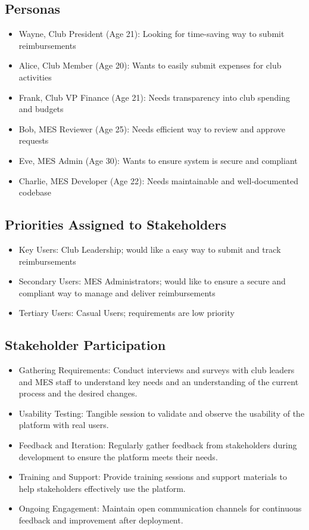 \documentclass[12pt]{article}
\begin{document}
  \subsection{Personas}
    \begin{itemize}
      \item Wayne, Club President (Age 21): Looking for time-saving way to submit reimbursements
      \item Alice, Club Member (Age 20): Wants to easily submit expenses for club activities
      \item Frank, Club VP Finance (Age 21): Needs transparency into club spending and budgets
      \item Bob, MES Reviewer (Age 25): Needs efficient way to review and approve requests
      \item Eve, MES Admin (Age 30): Wants to ensure system is secure and compliant
      \item Charlie, MES Developer (Age 22): Needs maintainable and well-documented codebase
    \end{itemize}
  \subsection{Priorities Assigned to Stakeholders}
    \begin{itemize}
      \item Key Users: Club Leadership; would like a easy way to submit and track reimbursements
      \item Secondary Users: MES Administrators; would like to ensure a secure and compliant way to manage and deliver reimbursements
      \item Tertiary Users: Casual Users; requirements are low priority
    \end{itemize}
  \subsection{Stakeholder Participation}
    \begin{itemize}
      \item Gathering Requirements: Conduct interviews and surveys with club leaders and MES staff to understand key needs and an understanding of the current process and the desired changes.
      \item Usability Testing: Tangible session to validate and observe the usability of the platform with real users. 
      \item Feedback and Iteration: Regularly gather feedback from stakeholders during development to ensure the platform meets their needs.
      \item Training and Support: Provide training sessions and support materials to help stakeholders effectively use the platform.
      \item Ongoing Engagement: Maintain open communication channels for continuous feedback and improvement after deployment.
    \end{itemize}
\end{document}

